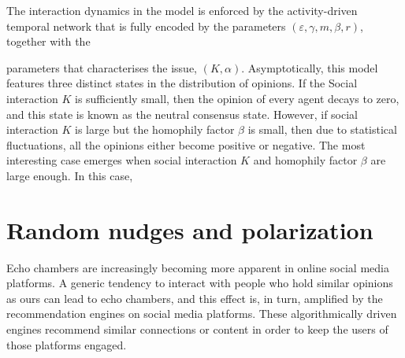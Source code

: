 \documentclass[%
 reprint,
superscriptaddress,
 amsmath,amssymb,
 aps,
 pre,
]{revtex4-1}
\begin{document}
The interaction dynamics in the model is enforced by the activity-driven temporal network that is fully encoded 
by the parameters $(\varepsilon, \gamma, m, \beta, r)$, together with the

parameters that characterises the issue, $(K, \alpha)$. Asymptotically, this model features three distinct states in the distribution of opinions. If the Social interaction $K$ is sufficiently small, then the opinion of every agent decays to zero, and this state is known as the neutral consensus state. However, if social interaction $K$ is large but the homophily factor $\beta$ is small, then due to statistical fluctuations, all the opinions either become positive or negative.  The most interesting case emerges when social interaction $K$ and homophily factor $\beta$ are large enough. In this case, 



\section{Random nudges and polarization}
\label{sec:random_nudge}
Echo chambers are increasingly becoming more apparent in online social media platforms. A generic tendency to interact with people who hold similar opinions as ours can lead to echo chambers, and this effect is, in turn, amplified by the recommendation engines on social media platforms. These algorithmically driven engines recommend similar connections or content in order to keep the users of those platforms engaged. 
\end{document}
